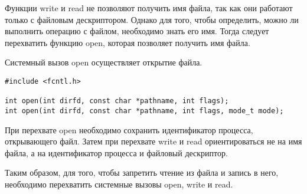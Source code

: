 Функции write и read не позволяют получить имя файла, так как они работают только с файловым дескриптором. Однако для того, чтобы определить, можно ли выполнить операцию с файлом, необходимо знать его имя. Тогда следует перехватить функцию open, которая позволяет получить имя файла.

Системный вызов open осуществляет открытие файла.

\begin{lstlisting}[label=code:open,caption=Функции open и write]
#include <fcntl.h>
	
int open(int dirfd, const char *pathname, int flags);
int open(int dirfd, const char *pathname, int flags, mode_t mode);
\end{lstlisting}

При перехвате open необходимо сохранить идентификатор процесса, открывающего файл. Затем при перехвате write и read ориентироваться не на имя файла, а на идентификатор процесса и файловый дескриптор.

Таким образом, для того, чтобы запретить чтение из файла и запись в него, необходимо перехватить системные вызовы open, write и read.






	





